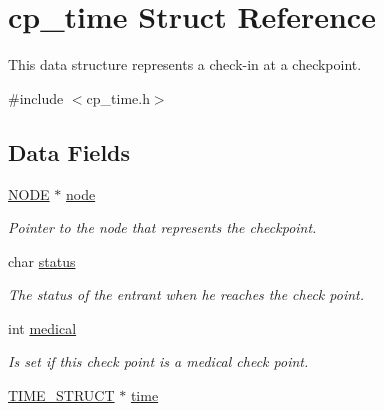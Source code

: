 \hypertarget{structcp__time}{\section{cp\-\_\-time Struct Reference}
\label{structcp__time}
}


This data structure represents a check-\/in at a checkpoint.  




{\ttfamily \#include $<$cp\-\_\-time.\-h$>$}

\subsection*{Data Fields}
{\bf }\par
\begin{DoxyCompactItemize}
\item 
\hypertarget{structcp__time_a127a337a91737225cc5bb39aea460bb8}{\hyperlink{node_8h_a01aae0d1f45b520aec535df5f9d9afb7}{N\-O\-D\-E} $\ast$ \hyperlink{structcp__time_a127a337a91737225cc5bb39aea460bb8}{node}}\label{structcp__time_a127a337a91737225cc5bb39aea460bb8}

\begin{DoxyCompactList}\small\item\em Pointer to the node that represents the checkpoint. \end{DoxyCompactList}\item 
\hypertarget{structcp__time_a5d6c3285ede15ebb5fc7c7f554fc3dbf}{char \hyperlink{structcp__time_a5d6c3285ede15ebb5fc7c7f554fc3dbf}{status}}\label{structcp__time_a5d6c3285ede15ebb5fc7c7f554fc3dbf}

\begin{DoxyCompactList}\small\item\em The status of the entrant when he reaches the check point. \end{DoxyCompactList}\item 
\hypertarget{structcp__time_a65a084e36bfaddf5abcfeec1fe810896}{int \hyperlink{structcp__time_a65a084e36bfaddf5abcfeec1fe810896}{medical}}\label{structcp__time_a65a084e36bfaddf5abcfeec1fe810896}

\begin{DoxyCompactList}\small\item\em Is set if this check point is a medical check point. \end{DoxyCompactList}\item 
\hypertarget{structcp__time_a78006393cc2913db19f9692a100fe273}{\hyperlink{time__struct_8h_a3bbd7adf563300f0bd980d2ea319881d}{T\-I\-M\-E\-\_\-\-S\-T\-R\-U\-C\-T} $\ast$ \hyperlink{structcp__time_a78006393cc2913db19f9692a100fe273}{time}}\label{structcp__time_a78006393cc2913db19f9692a100fe273}


\end{DoxyCompactItemize}
